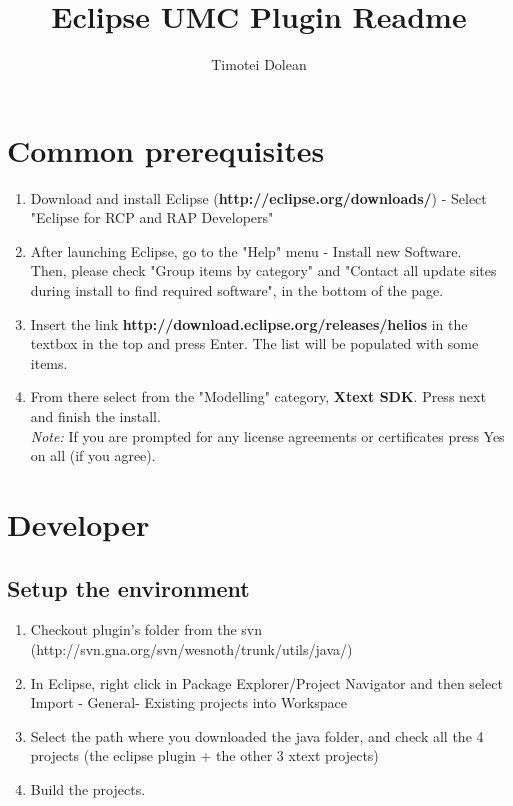 \documentclass[10pt]{article}
\title{Eclipse UMC Plugin Readme}
\author{Timotei Dolean}
\begin{document}
\maketitle

\newcommand{\icnt}{ \stepcounter{cnt} \thecnt }

\section{Common prerequisites}
\begin{enumerate}
\item Download and install Eclipse (\textbf{http://eclipse.org/downloads/}) - Select "Eclipse for RCP and RAP Developers"
\item After launching Eclipse, go to the "Help" menu - Install new Software. \\
  Then, please check "Group items by category" and "Contact all update sites during install to find required software",
  in the bottom of the page.
\item Insert the link \textbf{http://download.eclipse.org/releases/helios} in the textbox in the top and press Enter.
  The list will be populated with some items.
\item From there select from the "Modelling" category, \textbf{Xtext SDK}.
  Press next and finish the install.\\
  \textit{Note:} If you are prompted for any license agreements or certificates press Yes on all (if you agree).
\end{enumerate}

\section{Developer}
\subsection{Setup the environment}
\begin{enumerate}
\item Checkout plugin's folder from the svn (http://svn.gna.org/svn/wesnoth/trunk/utils/java/)
\item In Eclipse, right click in Package Explorer/Project Navigator and then select
  Import - General- Existing projects into Workspace
\item Select the path where you downloaded the java folder, and check all the 4 projects
  (the eclipse plugin + the other 3 xtext projects)
\item Build the projects.
\end{enumerate}
\end{document}
